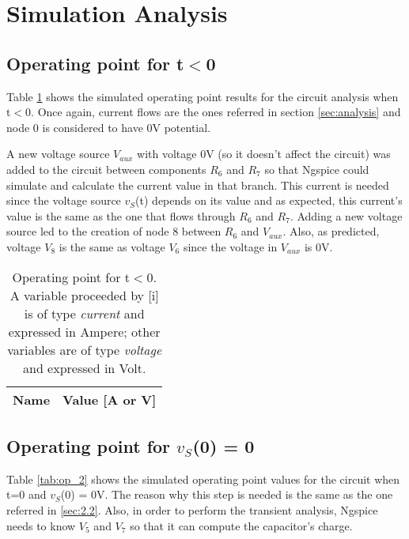 \section{Simulation Analysis}
\label{sec:simulation}

\subsection{Operating point for t$<$0}

Table \ref{tab:op_1} shows the simulated operating point results for the circuit analysis when t$<$0. Once again, current flows are the ones referred in section \ref{sec:analysis} and node 0 is considered to have 0V potential. \par
 A new voltage source $V_{aux}$ with voltage 0V (so it doesn't affect the circuit) was added to the circuit between components $R_6$ and $R_7$ so that Ngspice could simulate and calculate the current value in that branch. This current is needed since the voltage source $v_S$(t) depends on its value and as expected, this current's value is the same as the one that flows through $R_6$ and $R_7$. Adding a new voltage source led to the creation of node 8 between $R_6$ and $V_{aux}$. Also, as predicted, voltage $V_8$ is the same as voltage $V_6$ since the voltage in $V_{aux}$ is 0V.

\begin{table}[h]
  \centering
  \begin{tabular}{|l|r|}
    \hline    
    {\bf Name} & {\bf Value [A or V]} \\ \hline
    
  \end{tabular}
  \caption{Operating point for t$<$0. A variable proceeded by [i] is of type {\em current}
    and expressed in Ampere; other variables are of type {\it voltage} and expressed in
    Volt.}
  \label{tab:op_1}
\end{table}
\FloatBarrier

\subsection{Operating point for $v_S$(0) = 0}

Table \ref{tab:op_2} shows the simulated operating point values for the circuit when t=0 and $v_S$(0) = 0V. The reason why this step is needed is the same as the one referred in \ref{sec:2.2}. Also, in order to perform the transient analysis, Ngspice needs to know $V_5$ and $V_7$ so that it can compute the capacitor's charge. 

